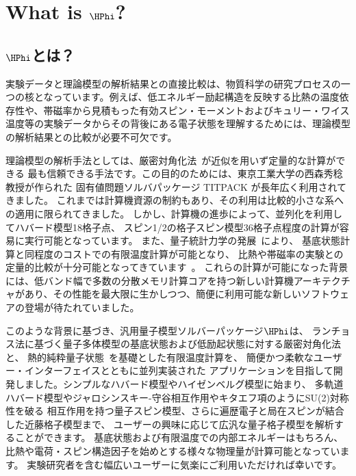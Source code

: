 \chapter{What is $\HPhi$?}
\label{Ch:whatishphi}
\section{$\HPhi$とは？}
実験データと理論模型の解析結果との直接比較は、物質科学の研究プロセスの一つの核となっています。例えば、低エネルギー励起構造を反映する比熱の温度依存性や、帯磁率から見積もった有効スピン・モーメントおよびキュリー・ワイス温度等の実験データからその背後にある電子状態を理解するためには、理論模型の解析結果との比較が必要不可欠です。

理論模型の解析手法としては、厳密対角化法~\cite{Dagotto}が近似を用いず定量的な計算ができる
最も信頼できる手法です。この目的のためには、東京工業大学の西森秀稔教授が作られた
固有値問題ソルバパッケージ TITPACK が長年広く利用されてきました。
これまでは計算機資源の制約もあり、その利用は比較的小さな系への適用に限られてきました。
しかし、計算機の進歩によって、並列化を利用してハバード模型18格子点、
スピン1/2の格子スピン模型36格子点程度の計算が容易に実行可能となっています。
また、量子統計力学の発展~\cite{Imada1986,FTLanczos,Hams,Sugiura2012}により、
基底状態計算と同程度のコストでの有限温度計算が可能となり、
比熱や帯磁率の実験との定量的比較が十分可能となってきています~\cite{Yamaji2014}。
これらの計算が可能になった背景には、低バンド幅で多数の分散メモリ計算コアを持つ新しい計算機アーキテクチャがあり、その性能を最大限に生かしつつ、簡便に利用可能な新しいソフトウェアの登場が待たれていました。

このような背景に基づき、汎用量子模型ソルバーパッケージ$\HPhi$は、
ランチョス法に基づく量子多体模型の基底状態および低励起状態に対する厳密対角化法と、
熱的純粋量子状態~\cite{Sugiura2012}を基礎とした有限温度計算を、
簡便かつ柔軟なユーザー・インターフェイスとともに並列実装された
アプリケーションを目指して開発しました。シンプルなハバード模型やハイゼンベルグ模型に始まり、
多軌道ハバード模型やジャロシンスキー-守谷相互作用やキタエフ項のようにSU(2)対称性を破る
相互作用を持つ量子スピン模型、さらに遍歴電子と局在スピンが結合した近藤格子模型まで、
ユーザーの興味に応じて広汎な量子格子模型を解析することができます。
基底状態および有限温度での内部エネルギーはもちろん、
比熱や電荷・スピン構造因子を始めとする様々な物理量が計算可能となっています。
実験研究者を含む幅広いユーザーに気楽にご利用いただければ幸いです。
